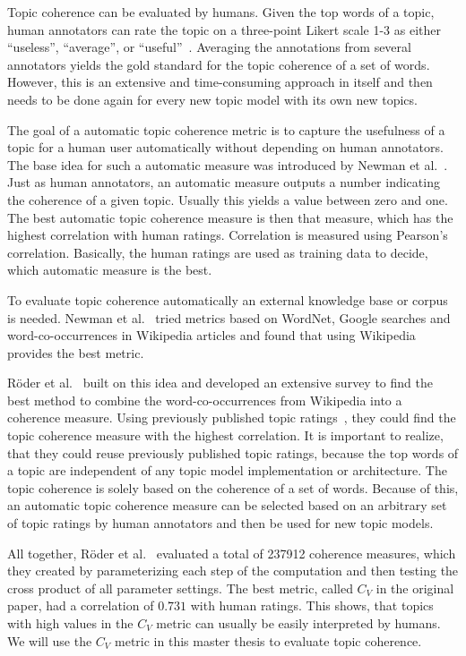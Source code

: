 \documentclass[
        a4paper,
        titlepage,
        twoside,
        parskip
        ]{scrbook}
\theoremstyle{break}
\begin{document}
Topic coherence can be evaluated by humans.
Given the top words of a topic, human annotators can rate the topic on a three-point Likert scale 1-3 as either ``useless'', ``average'', or ``useful''~\cite{Aletras2013}.
Averaging the annotations from several annotators yields the gold standard for the topic coherence of a set of words.
However, this is an extensive and time-consuming approach in itself and then needs to be done again for every new topic model with its own new topics.

The goal of a automatic topic coherence metric is to capture the usefulness of a topic for a human user automatically without depending on human annotators.
The base idea for such a automatic measure was introduced by Newman et al.~\cite{Newman2010}.
Just as human annotators, an automatic measure outputs a number indicating the coherence of a given topic.
Usually this yields a value between zero and one.
The best automatic topic coherence measure is then that measure, which has the highest correlation with human ratings.
Correlation is measured using Pearson's correlation.
Basically, the human ratings are used as training data to decide, which automatic measure is the best.

To evaluate topic coherence automatically an external knowledge base or corpus is needed.
Newman et al.~\cite{Newman2010} tried metrics based on WordNet, Google searches and word-co-occurrences in Wikipedia articles and found that using Wikipedia provides the best metric.

Röder et al.~\cite{Roder2015} built on this idea and developed an extensive survey to find the best method to combine the word-co-occurrences from Wikipedia into a coherence measure.
Using previously published topic ratings~\cite{Aletras2013,Chang2009,Newman2010,Rosner2013}, they could find the topic coherence measure with the highest correlation.
It is important to realize, that they could reuse previously published topic ratings, because the top words of a topic are independent of any topic model implementation or architecture.
The topic coherence is solely based on the coherence of a set of words.
Because of this, an automatic topic coherence measure can be selected based on an arbitrary set of topic ratings by human annotators and then be used for new topic models.

All together, Röder et al.~\cite{Roder2015} evaluated a total of 237912 coherence measures, which they created by parameterizing each step of the computation and then testing the cross product of all parameter settings.
The best metric, called $C_V$ in the original paper, had a correlation of $0.731$ with human ratings.
This shows, that topics with high values in the $C_V$ metric can usually be easily interpreted by humans.
We will use the $C_V$ metric in this master thesis to evaluate topic coherence.
\end{document}
